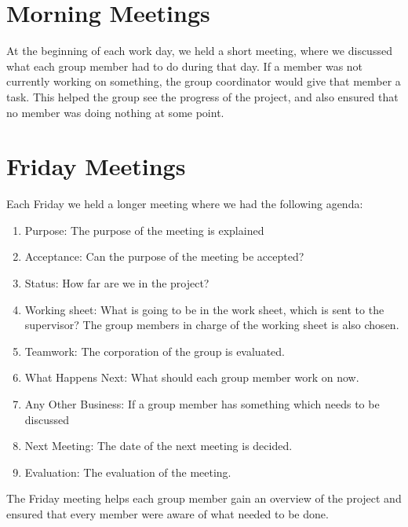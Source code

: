 \section{Morning Meetings}
At the beginning of each work day, we held a short meeting, where we discussed what each group member had to do during that day. If a member was not currently working on something, the group coordinator would give that member a task. This helped the group see the progress of the project, and also ensured that no member was doing nothing at some point.

\section{Friday Meetings}
Each Friday we held a longer meeting where we had the following agenda:

\begin{enumerate}
	\item Purpose: The purpose of the meeting is explained
	\item Acceptance: Can the purpose of the meeting be accepted? 
	\item Status: How far are we in the project?
	\item Working sheet: What is going to be in the work sheet, which is sent to the supervisor? The group members in charge of the working sheet is also chosen. 
	\item Teamwork: The corporation of the group is evaluated.  
	\item What Happens Next: What should each group member work on now.
	\item Any Other Business: If a group member has something which needs to be discussed
	\item Next Meeting: The date of the next meeting is decided. 
	\item Evaluation: The evaluation of the meeting. 
\end{enumerate}

The Friday meeting helps each group member gain an overview of the project and ensured that every member were aware of what needed to be done.